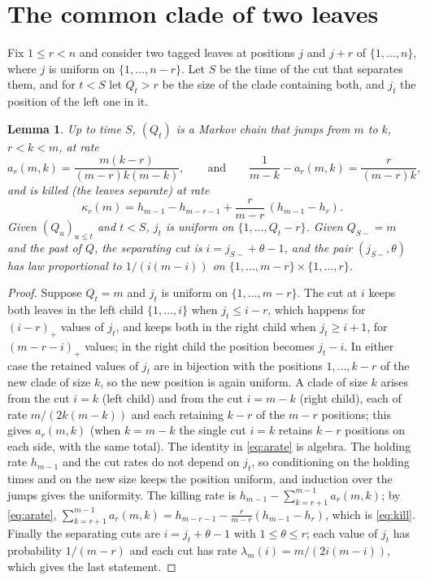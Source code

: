 \documentclass[11pt]{amsart}
\newtheorem{lemma}[theorem]{Lemma}
\theoremstyle{remark}
\numberwithin{equation}{section}
\begin{document}
\section{The common clade of two leaves}\label{sec:pair}

Fix $1\le r<n$ and consider two tagged leaves at positions $j$ and $j+r$ of $\{1,\dots,n\}$, where $j$ is uniform on $\{1,\dots,n-r\}$. Let $S$ be the time of the cut that separates them, and for $t<S$ let $Q_t>r$ be the size of the clade containing both, and $j_t$ the position of the left one in it.

\begin{lemma}\label{lem:pair}
Up to time $S$, $(Q_t)$ is a Markov chain that jumps from $m$ to $k$, $r<k<m$, at rate
\begin{equation}\label{eq:arate}
a_r(m,k)=\frac{m(k-r)}{(m-r)k(m-k)},\qquad\text{and}\qquad \frac1{m-k}-a_r(m,k)=\frac{r}{(m-r)k},
\end{equation}
and is killed (the leaves separate) at rate
\begin{equation}\label{eq:kill}
\kappa_r(m)=h_{m-1}-h_{m-r-1}+\frac r{m-r}\,(h_{m-1}-h_r).
\end{equation}
Given $(Q_u)_{u\le t}$ and $t<S$, $j_t$ is uniform on $\{1,\dots,Q_t-r\}$. Given $Q_{S-}=m$ and the past of $Q$, the separating cut is $i=j_{S-}+\theta-1$, and the pair $(j_{S-},\theta)$ has law proportional to $1/(i(m-i))$ on $\{1,\dots,m-r\}\times\{1,\dots,r\}$.
\end{lemma}

\begin{proof}
Suppose $Q_t=m$ and $j_t$ is uniform on $\{1,\dots,m-r\}$. The cut at $i$ keeps both leaves in the left child $\{1,\dots,i\}$ when $j_t\le i-r$, which happens for $(i-r)_+$ values of $j_t$, and keeps both in the right child when $j_t\ge i+1$, for $(m-r-i)_+$ values; in the right child the position becomes $j_t-i$. In either case the retained values of $j_t$ are in bijection with the positions $1,\dots,k-r$ of the new clade of size $k$, so the new position is again uniform. A clade of size $k$ arises from the cut $i=k$ (left child) and from the cut $i=m-k$ (right child), each of rate $m/(2k(m-k))$ and each retaining $k-r$ of the $m-r$ positions; this gives $a_r(m,k)$ (when $k=m-k$ the single cut $i=k$ retains $k-r$ positions on each side, with the same total). The identity in \eqref{eq:arate} is algebra. The holding rate $h_{m-1}$ and the cut rates do not depend on $j_t$, so conditioning on the holding times and on the new size keeps the position uniform, and induction over the jumps gives the uniformity. The killing rate is $h_{m-1}-\sum_{k=r+1}^{m-1}a_r(m,k)$; by \eqref{eq:arate}, $\sum_{k=r+1}^{m-1}a_r(m,k)=h_{m-r-1}-\frac r{m-r}(h_{m-1}-h_r)$, which is \eqref{eq:kill}. Finally the separating cuts are $i=j_t+\theta-1$ with $1\le\theta\le r$; each value of $j_t$ has probability $1/(m-r)$ and each cut has rate $\lambda_m(i)=m/(2i(m-i))$, which gives the last statement.
\end{proof}
\end{document}
